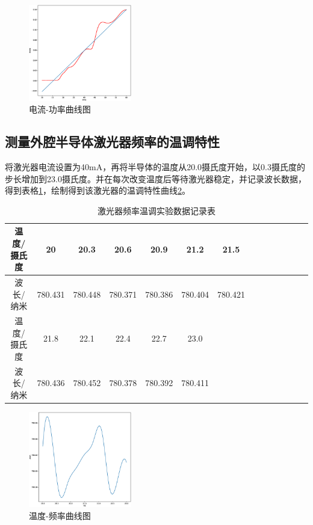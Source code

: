 \documentclass{article}
\begin{document}
\begin{CJK}{UTF8}{gkai}
\begin{figure}[H]
  \centering
  \includegraphics[width=0.4\textwidth]{exm1_1.eps}
  \caption{电流-功率曲线图}
  \label{f1.0}
\end{figure}

\subsection{测量外腔半导体激光器频率的温调特性}
将激光器电流设置为40mA，再将半导体的温度从20.0摄氏度开始，以0.3摄氏度的步长增加到23.0摄氏度。并在每次改变温度后等待激光器稳定，并记录波长数据，得到表格\ref{t2.1}，绘制得到该激光器的温调特性曲线\ref{f2.1}。
\begin{table}[H]
\centering
  \caption{激光器频率温调实验数据记录表}
  \label{t2.1}
  \begin{tabular}{|c|c|c|c|c|c|c|c|c|c|c|c|c|c|}
    \hline
    温度/摄氏度&20&20.3&20.6&20.9&21.2&21.5\\
    \hline
    波长/纳米&780.431&780.448&780.371&780.386&780.404&780.421\\
    \hline
    温度/摄氏度&21.8&22.1&22.4&22.7&23.0&\\
    \hline
    波长/纳米&780.436&780.452&780.378&780.392&780.411&\\
    \hline
  \end{tabular}
\end{table}
\begin{figure}[H]
  \centering
  \includegraphics[width=0.4\textwidth]{exm1_3.eps}
  \caption{温度-频率曲线图}
  \label{f2.1}
\end{figure}

\end{CJK}
\end{document}
